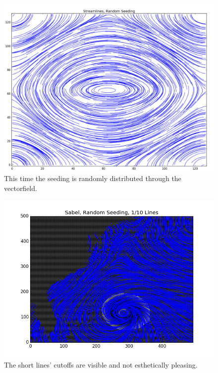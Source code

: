 \documentclass[a4paper,10pt]{report}
\begin{document}
\begin{figure}\centering
 \includegraphics[width=0.9\linewidth]{random}
 \caption{This time the seeding is randomly distributed through the vectorfield.}
 \label{fig2}
\end{figure}
\clearpage
\begin{figure}\centering
 \includegraphics[width=0.9\linewidth]{short}
 \caption{The short lines' cutoffs are visible and not esthetically pleasing.}
 \label{fig3}
\end{figure}
\end{document}
